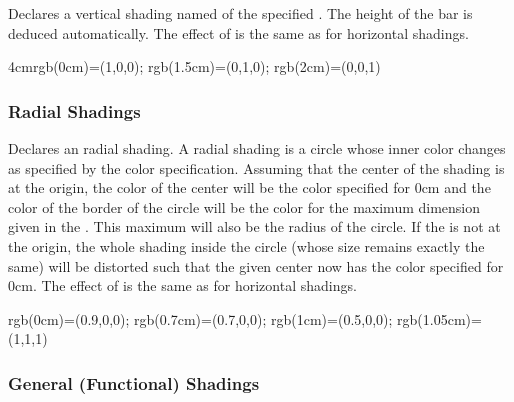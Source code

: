 \begin{command}{\pgfdeclareverticalshading{}}
   Declares a vertical shading named  of the
   specified . The height of the bar is deduced
   automatically. The effect of  is the same as for
   horizontal shadings.

\begin{codeexample}[]
  {4cm}{rgb(0cm)=(1,0,0); rgb(1.5cm)=(0,1,0); rgb(2cm)=(0,0,1)}
\end{codeexample}
\end{command}


\subsubsection{Radial Shadings}

\begin{command}{\pgfdeclareradialshading{}}
  Declares an radial shading. A radial shading is a circle whose inner
  color changes as specified by the color specification. Assuming that
  the center of the shading is at the origin, the color of the center
  will be the color specified for 0cm and the color of the border of
  the circle will be the color for the maximum dimension given in
  the . This maximum will also be the radius of
  the circle. If the  is not at the 
  origin, the whole shading inside the circle (whose size remains
  exactly the same) will be distorted such that the given center now
  has the color specified for 0cm. The effect of  is
  the same as for horizontal shadings. 

\begin{codeexample}[]  
%
  {rgb(0cm)=(0.9,0,0);
   rgb(0.7cm)=(0.7,0,0);
   rgb(1cm)=(0.5,0,0);
   rgb(1.05cm)=(1,1,1)}
\end{codeexample}
\end{command}


\subsubsection{General (Functional) Shadings}

